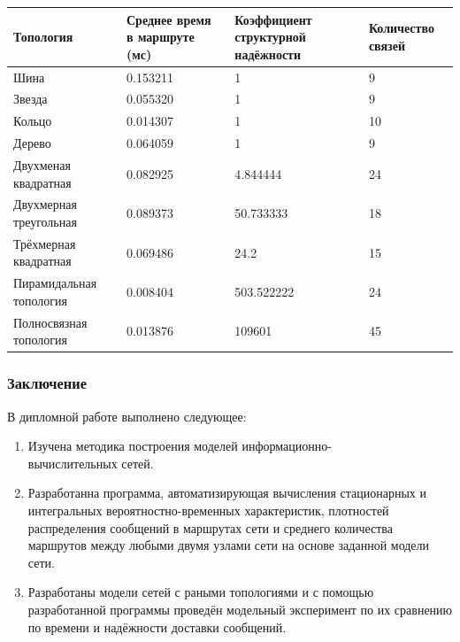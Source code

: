 \documentclass[aspectratio=43]{beamer}
\begin{document}
\begin{frame}

\begin{tabular}{|p{}|p{}|p{}|p{}|}
	\hline Топология & Среднее время в маршруте (мс) & Коэффициент структурной надёжности & Количество связей \\
	\hline Шина  & 0.153211 & 1 & 9 \\
	\hline Звезда & 0.055320 & 1 & 9 \\
	\hline Кольцо & 0.014307 & 1 & 10 \\
	\hline Дерево & 0.064059 & 1 & 9 \\
	\hline Двухменая квадратная & 0.082925 & 4.844444 & 24 \\
	\hline Двухмерная треугольная & 0.089373 & 50.733333 & 18 \\
	\hline Трёхмерная квадратная & 0.069486 & 24.2 & 15 \\
	\hline Пирамидальная топология & 0.008404 & 503.522222 & 24 \\
	\hline Полносвязная топология & 0.013876 & 109601 & 45 \\
	\hline
	\end{tabular}
\end{frame}

\begin{frame}
\frametitle{Заключение}

В дипломной работе выполнено следующее:	
\begin{enumerate}
	\item Изучена методика построения моделей информационно- \\ вычислительных сетей.
	 
	\item Разработанна программа, автоматизирующая вычисления стационарных и интегральных вероятностно-временных характеристик, плотностей распределения сообщений в маршрутах сети и среднего количества маршрутов между любыми двумя узлами сети на основе заданной модели сети.
	
	\item Разработаны модели сетей с раными топологиями и с помощью разработанной программы проведён модельный эксперимент по их сравнению по времени и надёжности доставки сообщений.
\end{enumerate}
\end{frame}
\end{document}

